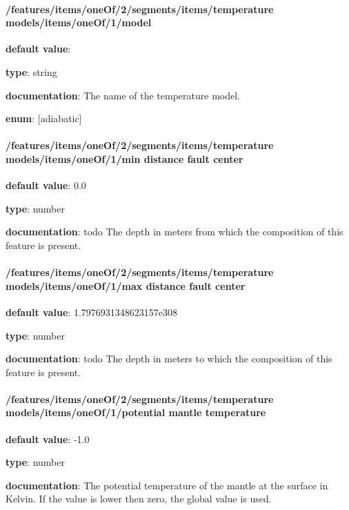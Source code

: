 \paragraph{/features/items/oneOf/2/segments/items/temperature models/items/oneOf/1/model} \begin{itemized}
\item {\bf default value}: 
\item {\bf type}: string
\item {\bf documentation}: The name of the temperature model.
\item {\bf enum}: [adiabatic]\end{itemized}\paragraph{/features/items/oneOf/2/segments/items/temperature models/items/oneOf/1/min distance fault center} \begin{itemized}
\item {\bf default value}: 0.0
\item {\bf type}: number
\item {\bf documentation}: todo The depth in meters from which the composition of this feature is present.
\end{itemized}\paragraph{/features/items/oneOf/2/segments/items/temperature models/items/oneOf/1/max distance fault center} \begin{itemized}
\item {\bf default value}: 1.7976931348623157e308
\item {\bf type}: number
\item {\bf documentation}: todo The depth in meters to which the composition of this feature is present.
\end{itemized}\paragraph{/features/items/oneOf/2/segments/items/temperature models/items/oneOf/1/potential mantle temperature} \begin{itemized}
\item {\bf default value}: -1.0
\item {\bf type}: number
\item {\bf documentation}: The potential temperature of the mantle at the surface in Kelvin. If the value is lower then zero, the global value is used.

\end{itemized}
